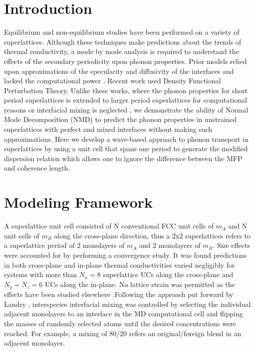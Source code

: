 \documentclass[aps,prb,preprint,preprintnumbers,amsmath,amssymb,floatfix,superscriptaddress]{revtex4}
\begin{document}
\section{Introduction}
Equilibrium \cite {PhysRevB.85.195302} and non-equilibrium \cite {PhysRevB.79.214307,PhysRevB.79.075316,PhysRevB.72.174302} studies have been performed on a variety of superlattices. Although these techniques make predictions about the trends of thermal conductivity, a mode by mode analysis is required to understand the effects of the secondary periodicity upon phonon properties. Prior models relied upon approximations of the specularity and diffusivity of the interfaces \cite {PhysRevB.57.14958} and lacked the computational power \cite {PhysRevB.70.081310}. Recent work \cite{Luckyanova16112012,doi:10.1021/nl202186y} used Density Functional Perturbation Theory. Unlike these works, where the phonon properties for short period superlattices is extended to larger period superlattices for computational reasons \cite{Luckyanova16112012} or interfacial mixing is neglected \cite{doi:10.1021/nl202186y}, we demonstrate the ability of Normal Mode Decomposition (NMD) to predict the phonon properties in unstrained superlattices with perfect and mixed interfaces without making such approximations. Here we develop a wave-based approach to phonon transport in superlattices by using a unit cell that spans one period to generate the modified dispersion relation which allows one to ignore the difference between the MFP and coherence length.

\section{Modeling Framework}
A superlattice unit cell consisted of N conventional FCC unit cells of $m_A$ and N unit cells of $m_B$ along the cross-plane direction, thus a 2x2 superlattices refers to a superlattice period of 2 monolayers of $m_A$ and 2 monolayers of $m_B$. Size effects were accounted for by performing a convergence study. It was found predictions in both cross-plane and in-plane thermal conductivities varied negligibly for systems with more than $N_x=8$ superlattice UCs along the cross-plane and $N_y=N_z=6$ UCs along the in-plane. No lattice strain was permitted as the effects have been studied elsewhere \cite{PhysRevB.72.174302}.Following the approach put forward by Landry \cite{PhysRevB.79.075316}, interspecies interfacial mixing was controlled by selecting the individual adjacent monolayers to an interface in the MD computational cell and flipping the masses of randomly selected atoms until the desired concentrations were reached. For example, a mixing of 80/20 refers an original/foreign blend in an adjacent monolayer.
\end{document}
